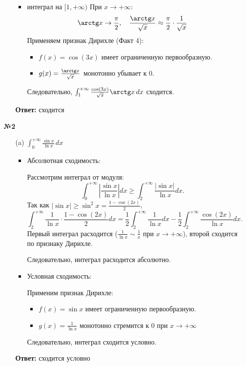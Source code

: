 \documentclass[a4paper]{article}
\renewcommand{\geq}{\geqslant}
\begin{document}
\begin{enumerate}
\begin{enumerate}
\begin{itemize}
     \item интеграл на $[1, +\infty)$
     При \(x \to +\infty\):  
     \[
     \arctg x \to \frac{\pi}{2}, \quad \frac{\arctg x}{\sqrt{x}}
      \approx \frac{\pi}{2} \cdot \frac{1}{\sqrt{x}}
     \]  
     Применяем признак Дирихле (Факт 4): 
      \begin{itemize}
        \item \(f(x) = \cos(3x)\) имеет ограниченную первообразную. 
        \item \(g(x) = \frac{\arctg x}{\sqrt{x}}\) монотонно убывает к 0.  
      \end{itemize}
      Следовательно, \(\int_{1}^{+\infty} \frac{\cos(3x)}{\sqrt{x}} 
      \arctg x \, dx\) сходится.
    \end{itemize}
    \textbf{Ответ: } сходится\\
  \end{enumerate}
  
  \item[\textbf{№2}]\begin{enumerate}
    \item[(a)]\(\int_{0}^{+\infty} \frac{\sin x}{\ln x} \, dx\)
    \begin{itemize}
      \item Абсолютная сходимость:
      
      Рассмотрим интеграл от модуля:  
     \[
     \int_{0}^{+\infty} \left|\frac{\sin x}{\ln x}\right| dx \geq \int_{2}^{+\infty} \frac{|\sin x|}{\ln x} dx.
     \]  
     Так как \(|\sin x| \geq \sin^2 x = \frac{1 - \cos(2x)}{2}\),  
     \[
     \int_{2}^{+\infty} \frac{1}{\ln x} \cdot \frac{1 - \cos(2x)}{2} dx = \frac{1}{2} \int_{2}^{+\infty} \frac{1}{\ln x} dx - \frac{1}{2} \int_{2}^{+\infty} \frac{\cos(2x)}{\ln x} dx.
     \]  
     Первый интеграл расходится (\(\frac{1}{\ln x} \sim \frac{1}{x}\) при \(x \to +\infty\)), второй сходится по признаку Дирихле.  
     
     Следовательно, интеграл расходится абсолютно.

     \item Условная сходимость:
     
     Применим признак Дирихле: 
     \begin{itemize}
      \item \(f(x) = \sin x\) имеет ограниченную первообразную.  
      \item \(g(x) = \frac{1}{\ln x}\) монотонно стремится к 0 при \(x \to +\infty\)
    \end{itemize}
    Следовательно, интеграл сходится условно.
    \end{itemize}
    \textbf{Ответ: } сходится условно\\


\end{enumerate}
\end{enumerate}
\end{document}
